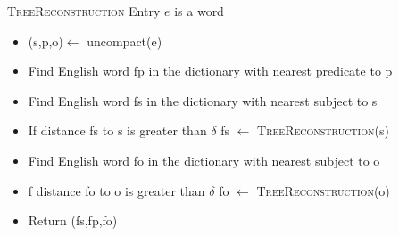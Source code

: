 



\textsc{TreeReconstruction}
Entry $e$ is a word

\begin{itemize}
\item (s,p,o)$\leftarrow$ uncompact(e)
\item Find English word fp in the dictionary with nearest predicate to p
\item Find English word fs in the dictionary with nearest subject to s
\item If distance fs to s is greater than $\delta$ fs $\leftarrow$ \textsc{TreeReconstruction}(s)
\item Find English word fo in the dictionary with nearest subject to o
\item f distance fo to o is greater than $\delta$ fo $\leftarrow$ \textsc{TreeReconstruction}(o)
\item Return (fs,fp,fo)
\end{itemize}


